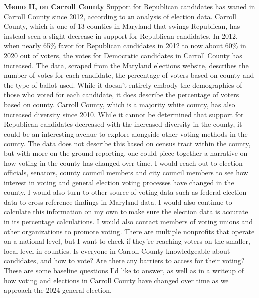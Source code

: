 \documentclass[
]{article}
\begin{document}
\textbf{Memo II, on Carroll County} Support for Republican candidates
has waned in Carroll County since 2012, according to an analysis of
election data. Carroll County, which is one of 13 counties in Maryland
that swings Republican, has instead seen a slight decrease in support
for Republican candidates. In 2012, when nearly 65\% favor for
Republican candidates in 2012 to now about 60\% in 2020 out of voters,
the votes for Democratic candidates in Carroll County has increased. The
data, scraped from the Maryland elections website, describes the number
of votes for each candidate, the percentage of voters based on county
and the type of ballot used. While it doesn't entirely embody the
demographics of those who voted for each candidate, it does describe the
percentage of voters based on county. Carroll County, which is a
majority white county, has also increased diversity since 2010. While it
cannot be determined that support for Republican candidates decreased
with the increased diversity in the county, it could be an interesting
avenue to explore alongside other voting methods in the county. The data
does not describe this based on census tract within the county, but with
more on the ground reporting, one could piece together a narrative on
how voting in the county has changed over time. I would reach out to
election officials, senators, county council members and city council
members to see how interest in voting and general election voting
processes have changed in the county. I would also turn to other source
of voting data such as federal election data to cross reference findings
in Maryland data. I would also continue to calculate this information on
my own to make sure the election data is accurate in its percentage
calculations. I would also contact members of voting unions and other
organizations to promote voting. There are multiple nonprofits that
operate on a national level, but I want to check if they're reaching
voters on the smaller, local level in counties. Is everyone in Carroll
County knowledgeable about candidates, and how to vote? Are there any
barriers to access for their voting? These are some baseline questions
I'd like to answer, as well as in a writeup of how voting and elections
in Carroll County have changed over time as we approach the 2024 general
election.
\end{document}
